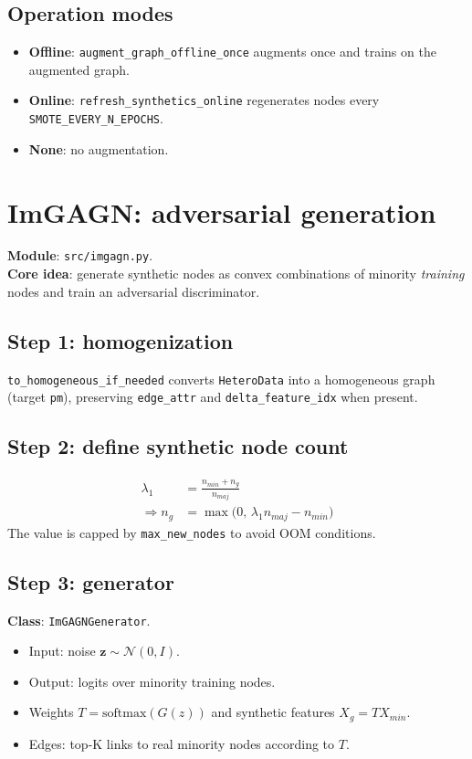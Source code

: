 \subsection{Operation modes}
\begin{itemize}[leftmargin=*]
  \item \textbf{Offline}: \texttt{augment\_graph\_offline\_once} augments once and trains on the augmented graph.
  \item \textbf{Online}: \texttt{refresh\_synthetics\_online} regenerates nodes every \texttt{SMOTE\_EVERY\_N\_EPOCHS}.
  \item \textbf{None}: no augmentation.
\end{itemize}

\section{ImGAGN: adversarial generation}
\label{sec:imgagn}
\textbf{Module}: \texttt{src/imgagn.py}.\\
\textbf{Core idea}: generate synthetic nodes as convex combinations of minority \emph{training} nodes and train an adversarial discriminator.

\subsection{Step 1: homogenization}
\texttt{to\_homogeneous\_if\_needed} converts \texttt{HeteroData} into a homogeneous graph (target \texttt{pm}), preserving \texttt{edge\_attr} and \texttt{delta\_feature\_idx} when present.

\subsection{Step 2: define synthetic node count}
\begin{align*}
\lambda_1 &= \frac{n_{min} + n_g}{n_{maj}} \\
\Rightarrow n_g &= \max\bigl(0,\, \lambda_1 n_{maj} - n_{min}\bigr)
\end{align*}
The value is capped by \texttt{max\_new\_nodes} to avoid OOM conditions.

\subsection{Step 3: generator}
\textbf{Class}: \texttt{ImGAGNGenerator}.\\
\begin{itemize}[leftmargin=*]
  \item Input: noise $\mathbf{z} \sim \mathcal{N}(0, I)$.
  \item Output: logits over minority training nodes.
  \item Weights $T = \mathrm{softmax}(G(z))$ and synthetic features $X_g = T X_{min}$.
  \item Edges: top-K links to real minority nodes according to $T$.
\end{itemize}

